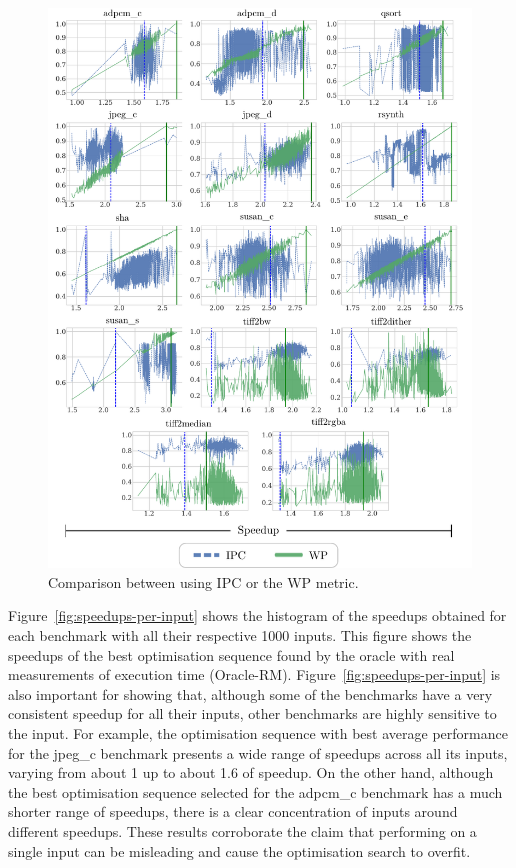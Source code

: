 \begin{figure}[h!]
    \centering
    \includegraphics[width=\textwidth]{figs/ipc-vs-work.pdf}
    \caption{Comparison between {\itercomp} using IPC or the WP metric.}
    \label{fig:ipc-vs-work}
\end{figure}


Figure~\ref{fig:speedups-per-input} shows the histogram of the speedups obtained for each benchmark with all their respective 1000 inputs.
This figure shows the speedups of the best optimisation sequence found by the oracle with real measurements of execution time (Oracle-RM).
Figure~\ref{fig:speedups-per-input} is also important for showing that, although some of the benchmarks have a very consistent speedup for all their inputs,
other benchmarks are highly sensitive to the input.
For example, the optimisation sequence with best average performance for the {\flagstype jpeg\_c} benchmark presents a wide range of speedups across all its inputs,
varying from about 1 up to about 1.6 of speedup.
On the other hand, although the best optimisation sequence selected for the {\flagstype adpcm\_c} benchmark has a much shorter range of speedups, there is a clear concentration of inputs around different speedups.
These results corroborate the claim that performing {\itercomp} on a single input can be misleading and cause the optimisation search to overfit.

